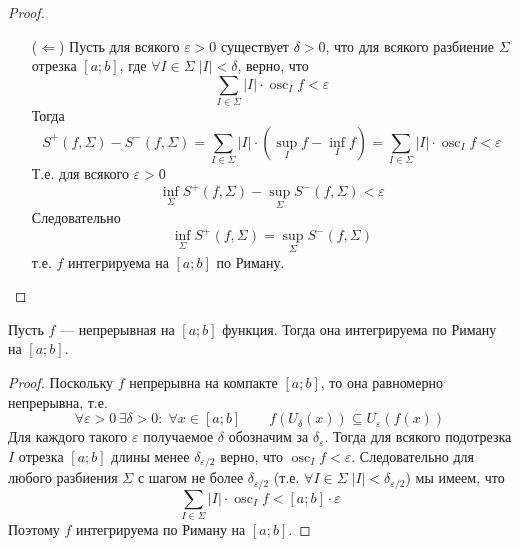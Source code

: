 \documentclass[12pt,a4paper]{article}
\DeclareMathOperator*{\osc}{osc}
\begin{document}
\begin{proof}
\begin{itemize}
            \item[($\Leftarrow$)] Пусть для всякого $\varepsilon > 0$ существует $\delta > 0$, что для всякого разбиение $\Sigma$ отрезка $[a; b]$, где $\forall I \in \Sigma\; |I| < \delta$, верно, что
                \[\sum_{I \in \Sigma} |I| \cdot \osc_I f < \varepsilon\]
                Тогда
                \[
                    S^+(f, \Sigma) - S^-(f, \Sigma)
                    = \sum_{I \in \Sigma} |I| \cdot (\sup_I f - \inf_I f)
                    = \sum_{I \in \Sigma} |I| \cdot \osc_I f
                    < \varepsilon
                \]
                Т.е. для всякого $\varepsilon > 0$
                \[\inf_{\Sigma} S^+(f, \Sigma) - \sup_{\Sigma} S^-(f, \Sigma) < \varepsilon\]
                Следовательно
                \[\inf_{\Sigma} S^+(f, \Sigma) = \sup_{\Sigma} S^-(f, \Sigma)\]
                т.е. $f$ интегрируема на $[a; b]$ по Риману.
        \end{itemize}
    \end{proof}

    \begin{theorem}
        Пусть $f$ --- непрерывная на $[a; b]$ функция. Тогда она интегрируема по Риману на $[a; b]$.
    \end{theorem}

    \begin{proof}
        Поскольку $f$ непрерывна на компакте $[a; b]$, то она равномерно непрерывна, т.е.
        \[\forall \varepsilon > 0\, \exists \delta > 0:\; \forall x \in [a; b]\qquad f(U_\delta(x)) \subseteq U_\varepsilon(f(x))\]
        Для каждого такого $\varepsilon$ получаемое $\delta$ обозначим за $\delta_\varepsilon$. Тогда для всякого подотрезка $I$ отрезка $[a; b]$ длины менее $\delta_{\varepsilon/ 2}$ верно, что $\osc_I f < \varepsilon$. Следовательно для любого разбиения $\Sigma$ с шагом не более $\delta_{\varepsilon/2}$ (т.е. $\forall I \in \Sigma\; |I| < \delta_{\varepsilon/2}$) мы имеем, что
        \[\sum_{I \in \Sigma} |I| \cdot \osc_I f < [a; b] \cdot \varepsilon\]
        Поэтому $f$ интегрируема по Риману на $[a; b]$.
    \end{proof}
\end{document}
